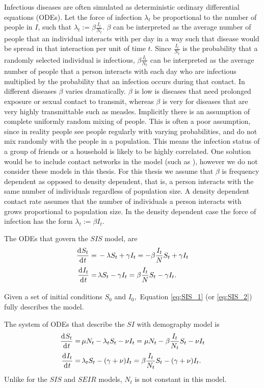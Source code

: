 Infectious diseases are often simulated as deterministic ordinary differential
equations (ODEs).
Let the force of infection $\lambda_t$ be
proportional to the number of people in $I$, such that
$\lambda_t := \beta \frac{I_t}{N_t}.$ $\beta$ can be interpreted as the average
number of people that an individual interacts with per day in a way such that
disease would be spread in that interaction per unit of time $t$.
Since $\frac{I_t}{N_t}$
is the probability that a randomly selected individual is infectious,
$\beta \frac{I_t}{N_t}$ can be interpreted as the average number of people that
a person interacts with each day who are infectious multiplied by the
probability that an infection occurs during that contact.
In different diseases $\beta$ varies dramatically. $\beta$ is low is
diseases that need prolonged exposure or sexual contact to transmit, whereas
$\beta$ is very for diseases that are very highly transmittable such as measles.
Implicitly there is an assumption of complete uniformly
random mixing of people. This is often a poor assumption, since in reality
people see people regularly with varying probabilities, and
do not mix randomly with the people in a population.
This means the infection status
of a group of friends or a household is likely to be highly correlated.
One solution would be to include contact networks in the model
(such as \cite{kerr_covasim_2021}), however we do not consider these models in
this thesis.
For this thesis we assume that $\beta$ is
frequency dependent as opposed to density dependent, that is,
a person interacts with the same number of individuals regardless
of population size. A density dependent contact rate assumes that the number
of individuals a person interacts with
grows proportional to population size. In the density dependent case the force
of infection has the form $\lambda_t := \beta I_t.$

The ODEs that govern the $SIS$ model,
are \begin{align}
    \frac{\diff S_t}{\diff t}
    = & \, -\lambda S_t + \gamma I_t
    = -\beta \frac{I_t}{N}S_t + \gamma I_t\label{eq:SIS_1} \\
    \frac{\diff I_t}{\diff t}
    = & \, \lambda S_t - \gamma I_t
    = \beta \frac{I_t}{N}S_t - \gamma I_t\label{eq:SIS_2}.
\end{align}

Given a set of initial conditions $S_0$ and $I_0,$ Equation
\ref{eq:SIS_1} (or \ref{eq:SIS_2}) fully describes the model.

The system of ODEs that describe the $SI$ with demography model is \begin{align}
    \frac{\diff S_t}{\diff t}
    = & \, \mu N_t - \lambda_t S_t - \nu I_t
    = \mu N_t -\beta \frac{I_t}{N_t}S_t - \nu I_t \label{eq:SI_1} \\
    \frac{\diff I_t}{\diff t}
    = & \, \lambda_t S_t - (\gamma + \nu)I_t
    = \beta \frac{I_t}{N_t}S_t - (\gamma + \nu) I_t\label{eq:SI_2}.
\end{align}
Unlike for the $SIS$ and $SEIR$ models, $N_t$ is not constant in this model.

